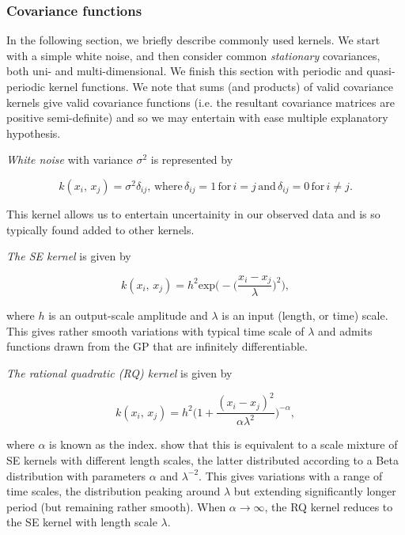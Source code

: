       \subsubsection{Covariance functions}

         \cite{Roberts2013} In the following section, we briefly describe commonly used kernels. We start with a simple white noise, and then consider common \textit{stationary} covariances, both uni- and multi-dimensional. We finish this section with periodic and quasi-periodic kernel functions. We note that sums (and products) of valid covariance kernels give valid covariance functions (i.e. the resultant covariance matrices are positive semi-definite) and so we may entertain with ease multiple explanatory hypothesis. 

         \vspace{1em}

         \textit{White noise} with variance \(\sigma^2\) is represented by
         
         \[k(x_{i}, \, x_{j}) = \sigma^2\delta_{ij}, \, \text{where} \, \delta_{ij} = 1 \, \text{for} \, i = j \, \text{and} \, \delta_{ij} = 0 \, \text{for} \, i \neq j.\]

         This kernel allows us to entertain uncertainity in our observed data and is so typically found added to other kernels.

         \vspace{1em}

         \textit{The SE kernel} is given by

         \[k(x_{i}, \, x_{j}) = h^{2} \text{exp} \bigg(- \Big(\frac{x_i - x_j}{\lambda} \Big)^2 \bigg),\]

         where \(h\) is an output-scale amplitude and \(\lambda\) is an input (length, or time) scale. This gives rather smooth variations with typical time scale of \(\lambda\) and admits functions drawn from the GP that are infinitely differentiable.

         \vspace{1em}

         \textit{The rational quadratic (RQ) kernel} is given by

         \[k(x_{i}, \, x_{j}) = h^{2} \bigg(1 + \frac{(x_{i} - x_{j})^2}{\alpha\lambda^2} \bigg)^{-\alpha},\]

         where \(\alpha\) is known as the index. \cite{Rasmussen2006} show that this is equivalent to a scale mixture of SE kernels with different length scales, the latter distributed according to a Beta distribution with parameters \(\alpha\) and \(\lambda^{-2}\). This gives variations with a range of time scales, the distribution peaking around \(\lambda\) but extending significantly longer period (but remaining rather smooth). When \(\alpha \to \infty\), the RQ kernel reduces to the SE kernel with length scale \(\lambda\).

